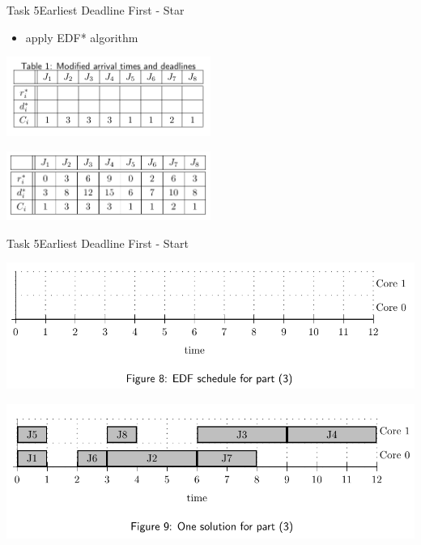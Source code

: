 \begin{frame}[allowframebreaks]{Task 5}{Earliest Deadline First - Star\vspace{0.5cm}}
  \begin{tasknoinc}
    \begin{itemize}
      \item apply \alert{EDF* algorithm}
    \end{itemize}
    \centering
    \includegraphics[width=0.5\textwidth]{./figures/5_table.png}
  \end{tasknoinc}
  \begin{solution}
    \centering
    \includegraphics[width=0.5\textwidth]{./figures/5_table_sol.png}
  \end{solution}
\end{frame}

\begin{frame}[allowframebreaks]{Task 5}{Earliest Deadline First - Start\vspace{0.5cm}}
  \begin{tasknoinc}
    \includegraphics[width=\textwidth]{./figures/5_diag.png}
  \end{tasknoinc}
  \begin{solution}
    \includegraphics[width=\textwidth]{./figures/5_diag_sol.png}
  \end{solution}
\end{frame}

